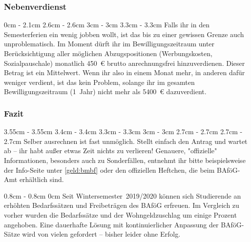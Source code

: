 \begin{multicols*}{2}
\subsubsection{Nebenverdienst}
0cm \columnwidth
0cm \columnwidth
0cm \columnwidth
0cm \columnwidth
0cm \columnwidth
0cm \columnwidth
0cm \columnwidth
2.1cm	\dimexpr\columnwidth - 2.1cm
2.6cm	\dimexpr\columnwidth - 2.6cm
3cm		\dimexpr\columnwidth - 3cm
3.3cm	\dimexpr\columnwidth - 3.3cm
Falls ihr in den Semesterferien ein wenig jobben wollt, ist das bis zu einer gewissen Grenze auch unproblematisch.
Im Moment dürft ihr im Bewilligungszeitraum unter Berücksichtigung aller möglichen Abzugspositionen (Werbungskosten, Sozialpauschale) monatlich \SI{450}{\euro} brutto anrechnungsfrei hinzuverdienen.
Dieser Betrag ist ein Mittelwert.
Wenn ihr also in einem Monat mehr, in anderen dafür weniger verdient, ist das kein Problem, solange ihr im gesamten Bewilligungszeitraum (1~Jahr) nicht mehr als \SI{5400}{\euro} dazuverdient.

\subsubsection{Fazit}
3.55cm	\dimexpr\columnwidth - 3.55cm
3.4cm	\dimexpr\columnwidth - 3.4cm
3.3cm	\dimexpr\columnwidth - 3.3cm
3cm		\dimexpr\columnwidth - 3cm
2.7cm	\dimexpr\columnwidth - 2.7cm
2.7cm	\dimexpr\columnwidth - 2.7cm
Selber ausrechnen ist fast unmöglich.
Stellt einfach den Antrag und wartet ab -- ihr habt außer etwas Zeit nichts zu verlieren! Genauere, "offizielle" Informationen, besonders auch zu Sonderfällen, entnehmt ihr bitte beispielsweise der Info-Seite unter \cref{geld:bmbf} oder den offiziellen Heftchen, die beim BAföG-Amt erhältlich sind.

0.8cm	\dimexpr\columnwidth - 0.8cm
0cm \columnwidth
0cm \columnwidth
0cm \columnwidth
0cm \columnwidth
0cm \columnwidth
0cm \columnwidth
Seit Wintersemester~2019/2020 können sich Studierende an erhöhten Bedarfssätzen und Freibeträgen des BAföG erfreuen.
Im Vergleich zu vorher wurden die Bedarfssätze und der Wohngeldzuschlag um einige Prozent angehoben.
Eine dauerhafte Lösung mit kontinuierlicher Anpassung der BAföG-Sätze wird von vielen gefordert -- bisher leider ohne Erfolg.


\end{multicols*}
